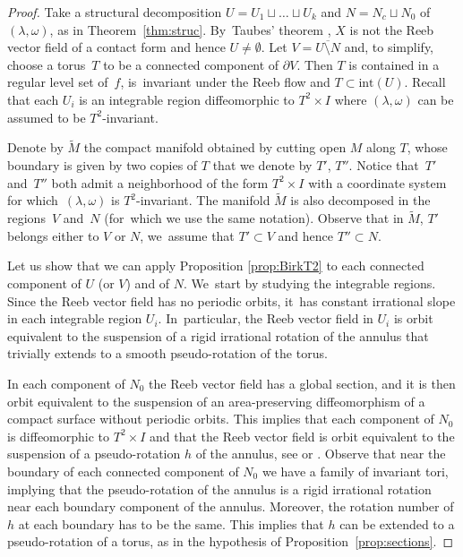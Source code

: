 \documentclass[11pt]{article}
\theoremstyle{definition}
\begin{document}
\begin{proof}
Take a structural decomposition $U=U_1\sqcup \ldots \sqcup U_k$ and $N= N_c \sqcup N_0$ of $(\lambda,\omega)$, as in Theorem~\ref{thm:struc}. By~Taubes' theorem \cite{Taub}, $X$ is not the Reeb vector field of a contact form and hence $U\neq \emptyset$. Let $V=\overline{U\setminus N}$ and, to simplify, choose a torus~$T$ to be a connected component of $\partial V$. Then $T$ is contained in a regular level set of~$f$, is~invariant under the Reeb flow and $T\subset \text{int}(U)$. Recall that each $U_i$ is an integrable region diffeomorphic to $T^2\times I$ where $(\lambda,\omega)$ can be assumed to be $T^2$-invariant.

Denote by $\widetilde{M}$ the compact manifold obtained by cutting open $M$ along $T$, whose boundary is given by two copies of $T$ that we denote by $T'$, $T''$. Notice that~$T'$ and~$T''$ both admit a neighborhood of the form $T^2\times I$ with a coordinate system for which~$(\lambda,\omega)$ is $T^2$-invariant. The manifold $\widetilde M$ is also decomposed in the regions~$V$ and~$N$ (for~which we use the same notation). Observe that in $\widetilde M$, $T'$ belongs either to $V$ or $N$, we~assume that $T'\subset V$ and hence $T''\subset N$.

Let us show that we can apply Proposition \ref{prop:BirkT2} to each connected component of $U$ (or $V$) and of $N$. We~start by studying the integrable regions. Since the Reeb vector field has no periodic orbits, it~has constant irrational slope in each integrable region $U_i$. In~particular, the Reeb vector field in $U_i$ is orbit equivalent to the suspension of a rigid irrational rotation of the annulus that trivially extends to a smooth pseudo-rotation of the torus.

In each component of $N_0$ the Reeb vector field has a global section, and it is then orbit equivalent to the suspension of an area-preserving diffeomorphism of a compact surface without periodic orbits. This implies that each component of $N_0$ is diffeomorphic to $T^2\times I$ and that the Reeb vector field is orbit equivalent to the suspension of a pseudo-rotation $h$ of the annulus, see \cite[p.\,20]{Re} or \cite[\S 5.3]{HT}. Observe that near the boundary of each connected component of $N_0$ we have a family of invariant tori, implying that the pseudo-rotation of the annulus is a rigid irrational rotation near each boundary component of the annulus. Moreover, the rotation number of $h$ at each boundary has to be the same. This implies that $h$ can be extended to a pseudo-rotation of a torus, as in the hypothesis of Proposition~\ref{prop:sections}.


\end{proof}
\end{document}
